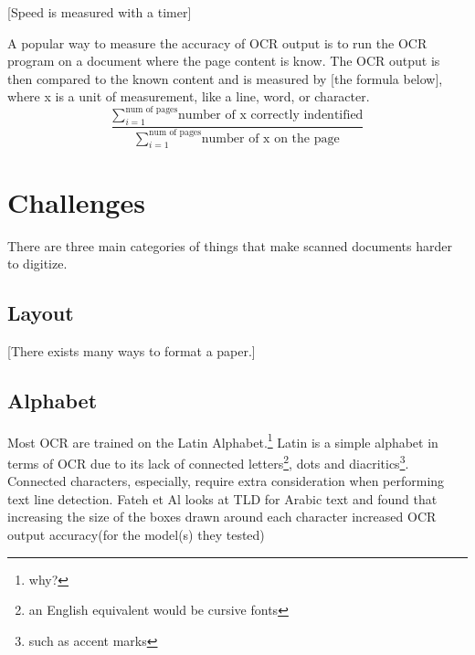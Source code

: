 \documentclass[sigplan,screen,nonacm]{acmart-tagged}
\begin{document}
[Speed is measured with a timer]

A popular way to measure the accuracy of OCR output is to run the OCR program on a document where the page content is know. The OCR output is then compared to the known content and is measured by [the formula below], where x is a unit of measurement, like a line, word, or character.
\[
\dfrac{\sum\limits_{i=1}^\text{num of pages}\text{number of x correctly indentified}}{\sum\limits_{i=1}^\text{num of pages}\text{number of x on the page}}
\]

\section{Challenges}
\label{sec:body}

There are three main categories of things that make scanned documents harder to digitize. 

\subsection{Layout}
\label{sec:Layout}

[There exists many ways to format a paper.] 



\subsection{Alphabet}
\label{sec:Alphabet}


Most OCR are trained on the Latin Alphabet.\footnote{why?} Latin is a simple alphabet in terms of OCR due to its lack of connected letters\footnote{an English equivalent would be cursive fonts}, dots and diacritics\footnote{such as accent marks}. Connected characters, especially, require extra consideration when performing text line detection. Fateh et Al\citep{Fateh:2024} looks at TLD for Arabic text and found that increasing the size of the boxes drawn around each character increased OCR output accuracy(for the model(s) they tested) 
\end{document}
